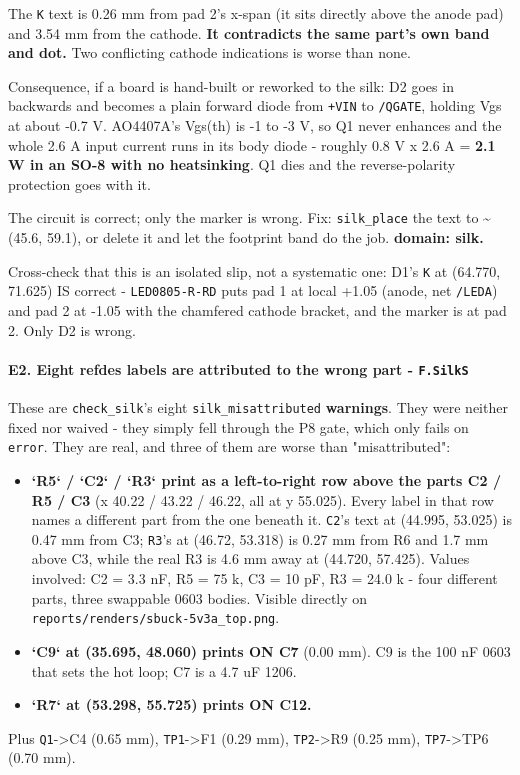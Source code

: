 \documentclass[11pt,a4paper]{article}
\begin{document}
The \texttt{K} text is 0.26 mm from pad 2's x-span (it sits directly above the anode pad) and 3.54 mm from the cathode. \textbf{It contradicts the same part's own band and dot.} Two conflicting cathode indications is worse than none.

Consequence, if a board is hand-built or reworked to the silk: D2 goes in backwards and becomes a plain forward diode from \texttt{+VIN} to \texttt{/QGATE}, holding Vgs at about -0.7 V. AO4407A's Vgs(th) is -1 to -3 V, so Q1 never enhances and the whole 2.6 A input current runs in its body diode - roughly 0.8 V x 2.6 A = \textbf{2.1 W in an SO-8 with no heatsinking}. Q1 dies and the reverse-polarity protection goes with it.

The circuit is correct; only the marker is wrong. Fix: \texttt{silk\_place} the text to \textasciitilde{}(45.6, 59.1), or delete it and let the footprint band do the job. \textbf{domain: silk.}

Cross-check that this is an isolated slip, not a systematic one: D1's \texttt{K} at (64.770, 71.625) IS correct - \texttt{LED0805-R-RD} puts pad 1 at local +1.05 (anode, net \texttt{/LEDA}) and pad 2 at -1.05 with the chamfered cathode bracket, and the marker is at pad 2. Only D2 is wrong.

\paragraph*{E2. Eight refdes labels are attributed to the wrong part - \texttt{F.SilkS}}
These are \texttt{check\_silk}'s eight \texttt{silk\_misattributed} \textbf{warnings}. They were neither fixed nor waived - they simply fell through the P8 gate, which only fails on \texttt{error}. They are real, and three of them are worse than "misattributed":

\begin{itemize}
\item \textbf{`R5` / `C2` / `R3` print as a left-to-right row above the parts C2 / R5 / C3}
(x 40.22 / 43.22 / 46.22, all at y 55.025). Every label in that row names a different
part from the one beneath it. \texttt{C2}'s text at (44.995, 53.025) is 0.47 mm from C3;
\texttt{R3}'s at (46.72, 53.318) is 0.27 mm from R6 and 1.7 mm above C3, while the real R3 is
4.6 mm away at (44.720, 57.425). Values involved: C2 = 3.3 nF, R5 = 75 k, C3 = 10 pF,
R3 = 24.0 k - four different parts, three swappable 0603 bodies. Visible directly on
\texttt{reports/renders/sbuck-5v3a\_top.png}.
\item \textbf{`C9` at (35.695, 48.060) prints ON C7} (0.00 mm). C9 is the 100 nF 0603 that sets the
hot loop; C7 is a 4.7 uF 1206.
\item \textbf{`R7` at (53.298, 55.725) prints ON C12.}
\end{itemize}
Plus \texttt{Q1}-\textgreater{}C4 (0.65 mm), \texttt{TP1}-\textgreater{}F1 (0.29 mm), \texttt{TP2}-\textgreater{}R9 (0.25 mm), \texttt{TP7}-\textgreater{}TP6 (0.70 mm).
\end{document}
